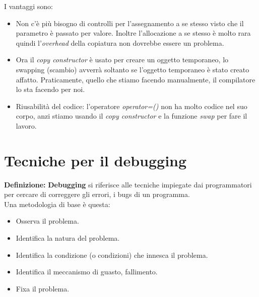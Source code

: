 \textsf{\small I vantaggi sono: } \\

\begin{itemize} %
	\item \textsf{\small Non c'è più bisogno di controlli per l'assegnamento a se stesso visto che il parametro è passato per valore. Inoltre l'allocazione a se stesso è molto rara quindi l'\emph{overhead} della copiatura non dovrebbe essere un problema.}
	\item \textsf{\small Ora il \emph{copy constructor} è usato per creare un oggetto temporaneo, lo swapping (scambio) avverrà soltanto se l'oggetto temporaneo è stato creato affatto. Praticamente, quello che stiamo facendo manualmente, il compilatore lo sta facendo per noi.}
	\item \textsf{\small Riusabilità del codice: l'operatore \emph{operator=()} non ha molto codice nel suo corpo, anzi stiamo usando il \emph{copy constructor} e la funzione \emph{swap} per fare il lavoro.}
\end{itemize}



\newpage

\section{Tecniche per il debugging}

\textsf{\small \textbf{Definizione: } \textbf{Debugging} si riferisce alle tecniche impiegate dai programmatori per cercare di correggere gli errori, i bugs di un programma.} \\

\textsf{\small Una metodologia di base è questa: } \\

\begin{itemize}
	\item \textsf{\small Osserva il problema.}
	\item \textsf{\small Identifica la natura del problema.}
	\item \textsf{\small Identifica la condizione (o condizioni) che innesca il problema.}
	\item \textsf{\small Identifica il meccanismo di guasto, fallimento.}
	\item \textsf{\small Fixa il problema.}
\end{itemize}

